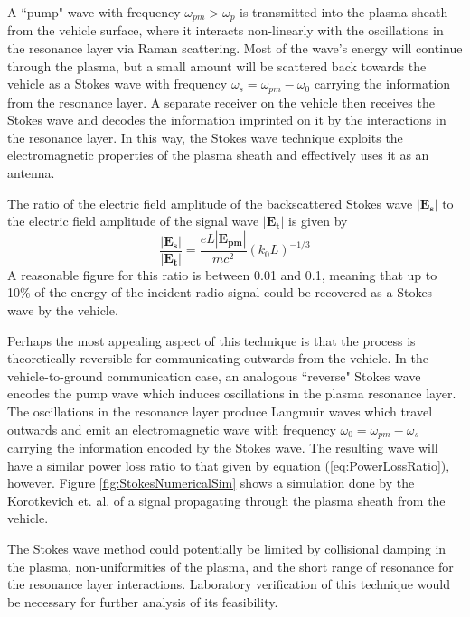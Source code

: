 \documentclass[twocolumn]{article}
\begin{document}
			A ``pump" wave with frequency $\omega_{pm} > \omega_p$ is transmitted into the plasma sheath from the vehicle surface, where it interacts non-linearly with the oscillations in the resonance layer via Raman scattering.
			Most of the wave's energy will continue through the plasma, but a small amount will be scattered back towards the vehicle as a Stokes wave with frequency $\omega_s = \omega_{pm} - \omega_0$ carrying the information from the resonance layer.
			A separate receiver on the vehicle then receives the Stokes wave and decodes the information imprinted on it by the interactions in the resonance layer.
			In this way, the Stokes wave technique exploits the electromagnetic properties of the plasma sheath and effectively uses it as an antenna.
			
			The ratio of the electric field amplitude of the backscattered Stokes wave  $\left|\mathbf{E_s}\right|$ to the electric field amplitude of the signal wave $\left|\mathbf{E_t}\right|$ is given by
			\begin{equation}
			\label{eq:PowerLossRatio}
			\frac{\left|\mathbf{E_s}\right|}{\left|\mathbf{E_t}\right|} = \frac{eL\left|\mathbf{E_{pm}}\right|}{mc^2} \left(k_0 L\right)^{-1/3}
			\end{equation}
			A reasonable figure for this ratio is between 0.01 and 0.1, meaning that up to 10\% of the energy of the incident radio signal could be recovered as a Stokes wave by the vehicle.\cite{nazarenko_communication_1994}
			
			Perhaps the most appealing aspect of this technique is that the process is theoretically reversible for communicating outwards from the vehicle.
			In the vehicle-to-ground communication case, an analogous ``reverse" Stokes wave encodes the pump wave which induces oscillations in the plasma resonance layer.
			The oscillations in the resonance layer produce Langmuir waves which travel outwards and emit an electromagnetic wave with frequency $\omega_0 = \omega_{pm} - \omega_s$ carrying the information encoded by the Stokes wave.
			The resulting wave will have a similar power loss ratio to that given by equation (\ref{eq:PowerLossRatio}), however.
			Figure \ref{fig:StokesNumericalSim} shows a simulation done by the Korotkevich et. al. of a signal propagating through the plasma sheath from the vehicle.
			
			The Stokes wave method could potentially be limited by collisional damping in the plasma, non-uniformities of the plasma, and the short range of resonance for the resonance layer interactions.\cite{kim_electromagnetic_2009}
			Laboratory verification of this technique would be necessary for further analysis of its feasibility.
			
\end{document}
